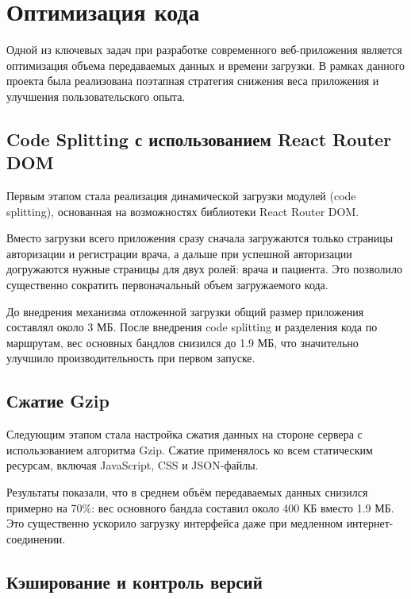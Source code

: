 \chapter{Оптимизация кода}\label{ch:optimization}

Одной из ключевых задач при разработке современного веб-приложения является оптимизация объема передаваемых данных и времени загрузки.
В рамках данного проекта была реализована поэтапная стратегия снижения веса приложения и улучшения пользовательского опыта.

\section{Code Splitting с использованием React Router DOM}\label{sec:code-splitting}

Первым этапом стала реализация динамической загрузки модулей (code splitting), основанная на возможностях библиотеки React Router DOM\@.

Вместо загрузки всего приложения сразу сначала загружаются только страницы авторизации и регистрации врача, а дальше при успешной авторизации догружаются нужные страницы для двух ролей: врача и пациента.
Это позволило существенно сократить первоначальный объем загружаемого кода.

До внедрения механизма отложенной загрузки общий размер приложения составлял около 3 МБ.
После внедрения code splitting и разделения кода по маршрутам, вес основных бандлов снизился до 1.9 МБ, что значительно улучшило производительность при первом запуске.

\section{Сжатие Gzip}\label{sec:gzip}

Следующим этапом стала настройка сжатия данных на стороне сервера с использованием алгоритма Gzip.
Сжатие применялось ко всем статическим ресурсам, включая JavaScript, CSS и JSON-файлы.

Результаты показали, что в среднем объём передаваемых данных снизился примерно на 70\%: вес основного бандла составил около 400 КБ вместо 1.9 МБ.
Это существенно ускорило загрузку интерфейса даже при медленном интернет-соединении.

\section{Кэширование и контроль версий}\label{sec:caching}

